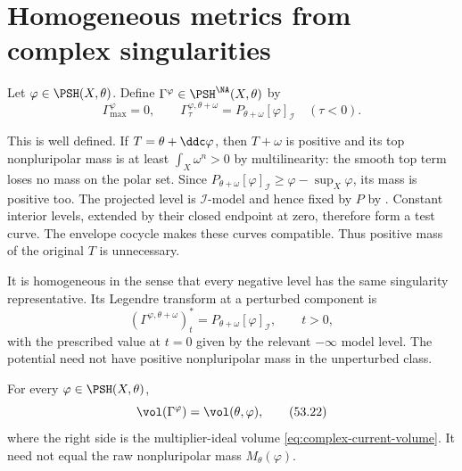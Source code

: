 \section{Homogeneous metrics from complex singularities}
\label{sec:tna-homogeneous}

\begin{definition}
\label{def:tna-homogeneous}
Let $\varphi\in\PSH(X,\theta)$.  Define
$\Gamma^\varphi\in\PSH^{\NA}(X,\theta)$ by
\[
 \Gamma^\varphi_{\max}=0,\qquad
 \Gamma_{\tau}^{\varphi,\theta+\omega}
 =P_{\theta+\omega}[\varphi]_{\mathcal I}
 \quad(\tau<0).
\tag{53.20}\label{eq:tna-homogeneous}
\]
\end{definition}

This is well defined.  If $T=\theta+\ddc\varphi$, then
$T+\omega$ is positive and its top nonpluripolar mass is at least
$\int_X\omega^n>0$ by multilinearity: the smooth top term loses no
mass on the polar set.  Since
$P_{\theta+\omega}[\varphi]_{\mathcal I}\geq\varphi-\sup_X\varphi$,
its mass is positive too.  The projected level is $\mathcal I$-model
and hence fixed by $P$ by .
Constant interior levels, extended by their closed endpoint at zero,
therefore form a test curve.  The envelope cocycle makes these curves
compatible.  Thus positive mass of the original $T$ is unnecessary.


It is homogeneous in the sense that every negative level has the same
singularity representative.  Its Legendre transform at a perturbed
component is
\[
 (\Gamma^{\varphi,\theta+\omega})_t^*
       =P_{\theta+\omega}[\varphi]_{\mathcal I},
 \qquad t>0,
\tag{53.21}\label{eq:tna-homogeneous-legendre}
\]
with the prescribed value at $t=0$ given by the relevant
$-\infty$ model level.  The potential need not have positive
nonpluripolar mass in the unperturbed class.

\begin{proposition}\label{prop:tna-homogeneous-volume}
For every $\varphi\in\PSH(X,\theta)$,
\[
                \vol(\Gamma^\varphi)
                =\vol(\theta,\varphi),
\tag{53.22}\label{eq:tna-homogeneous-volume}
\]
where the right side is the multiplier-ideal volume
\eqref{eq:complex-current-volume}.  It need not equal the raw
nonpluripolar mass $M_\theta(\varphi)$.
\end{proposition}

